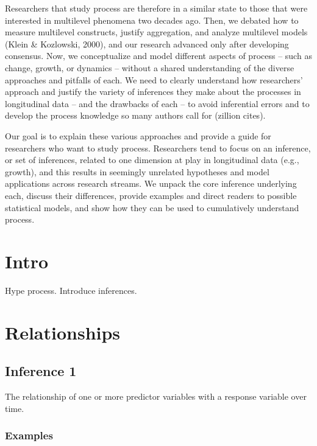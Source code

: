 \documentclass[]{article}
\begin{document}
Researchers that study process are therefore in a similar state to those
that were interested in multilevel phenomena two decades ago. Then, we
debated how to measure multilevel constructs, justify aggregation, and
analyze multilevel models (Klein \& Kozlowski, 2000), and our research
advanced only after developing consensus. Now, we conceptualize and
model different aspects of process -- such as change, growth, or
dynamics -- without a shared understanding of the diverse approaches and
pitfalls of each. We need to clearly understand how researchers'
approach and justify the variety of inferences they make about the
processes in longitudinal data -- and the drawbacks of each -- to avoid
inferential errors and to develop the process knowledge so many authors
call for (zillion cites).

Our goal is to explain these various approaches and provide a guide for
researchers who want to study process. Researchers tend to focus on an
inference, or set of inferences, related to one dimension at play in
longitudinal data (e.g., growth), and this results in seemingly
unrelated hypotheses and model applications across research streams. We
unpack the core inference underlying each, discuss their differences,
provide examples and direct readers to possible statistical models, and
show how they can be used to cumulatively understand process.

\hypertarget{intro}{%
\section{Intro}\label{intro}}

Hype process. Introduce inferences.

\hypertarget{relationships}{%
\section{Relationships}\label{relationships}}

\hypertarget{inference-1}{%
\subsection{Inference 1}\label{inference-1}}

The relationship of one or more predictor variables with a response
variable over time.

\hypertarget{examples}{%
\subsubsection{Examples}\label{examples}}
\end{document}
